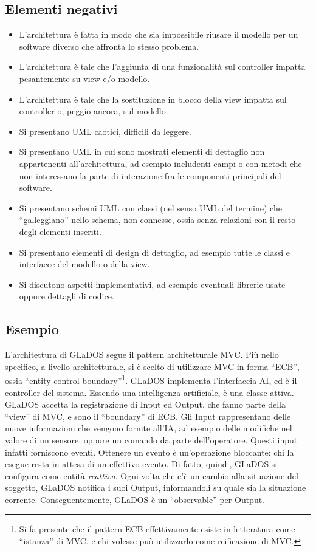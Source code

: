 \documentclass[a4paper,12pt]{report}
\begin{document}
\subsection*{Elementi negativi}
\begin{itemize}
 \item L'architettura è fatta in modo che sia impossibile riusare il modello per un software diverso che affronta lo stesso problema.
 \item L'architettura è tale che l'aggiunta di una funzionalità sul controller impatta pesantemente su view e/o modello.
 \item L'architettura è tale che la sostituzione in blocco della view impatta sul controller o, peggio ancora, sul modello.
 \item Si presentano UML caotici, difficili da leggere.
 \item Si presentano UML in cui sono mostrati elementi di dettaglio non appartenenti all'architettura, ad esempio includenti campi o con metodi che non interessano la parte di interazione fra le componenti principali del software.
 \item Si presentano schemi UML con classi (nel senso UML del termine) che ``galleggiano'' nello schema, non connesse, ossia senza relazioni con il resto degli elementi inseriti.
 \item Si presentano elementi di design di dettaglio, ad esempio tutte le classi e interfacce del modello o della view.
 \item Si discutono aspetti implementativi, ad esempio eventuali librerie usate oppure dettagli di codice.
\end{itemize}

\subsection*{Esempio}

L'architettura di GLaDOS segue il pattern architetturale MVC.
%
Più nello specifico, a livello architetturale, si è scelto di utilizzare MVC in forma ``ECB'', ossia ``entity-control-boundary''\footnote{
Si fa presente che il pattern ECB effettivamente esiste in letteratura come ``istanza'' di MVC, e chi volesse può utilizzarlo come reificazione di MVC.
}.
%
GLaDOS implementa l'interfaccia AI, ed è il controller del sistema.
Essendo una intelligenza artificiale, è una classe attiva.
%
GLaDOS accetta la registrazione di Input ed Output, che fanno parte della ``view'' di MVC, e sono il ``boundary'' di ECB.
Gli Input rappresentano delle nuove informazioni che vengono fornite all'IA, ad esempio delle modifiche nel valore di un sensore, oppure un comando da parte dell'operatore.
Questi input infatti forniscono eventi.
Ottenere un evento è un'operazione bloccante: chi la esegue resta in attesa di un effettivo evento. 
Di fatto, quindi, GLaDOS si configura come entità \textit{reattiva}.
Ogni volta che c'è un cambio alla situazione del soggetto, GLaDOS notifica i suoi Output, 
informandoli su quale sia la situazione corrente.
%
Conseguentemente, GLaDOS è un ``observable'' per Output.
\end{document}
